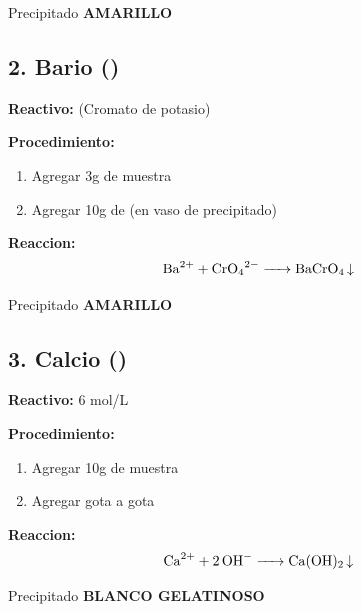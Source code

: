 \documentclass[11pt,a4paper]{article}
\begin{document}
\begin{resultado}
Precipitado \textbf{\textcolor{amarillo!80!black}{AMARILLO}}
\end{resultado}

\subsection{2. Bario ()}

\textbf{Reactivo:}  (Cromato de potasio)

\textbf{Procedimiento:}
\begin{enumerate}[leftmargin=*]
    \item Agregar 3g de muestra
    \item Agregar 10g de  (en vaso de precipitado)
\end{enumerate}

\begin{reaccionbox}
\textbf{Reaccion:}
\begin{equation*}
\ce{Ba^{2+} + CrO4^{2-} -> BaCrO4 v}
\end{equation*}
\end{reaccionbox}

\begin{resultado}
Precipitado \textbf{\textcolor{amarillo!80!black}{AMARILLO}}
\end{resultado}

\subsection{3. Calcio ()}

\textbf{Reactivo:}  6 mol/L

\textbf{Procedimiento:}
\begin{enumerate}[leftmargin=*]
    \item Agregar 10g de muestra
    \item Agregar  gota a gota
\end{enumerate}

\begin{reaccionbox}
\textbf{Reaccion:}
\begin{equation*}
\ce{Ca^{2+} + 2OH^- -> Ca(OH)2 v}
\end{equation*}
\end{reaccionbox}

\begin{resultado}
Precipitado \textbf{BLANCO GELATINOSO}
\end{resultado}
\end{document}
